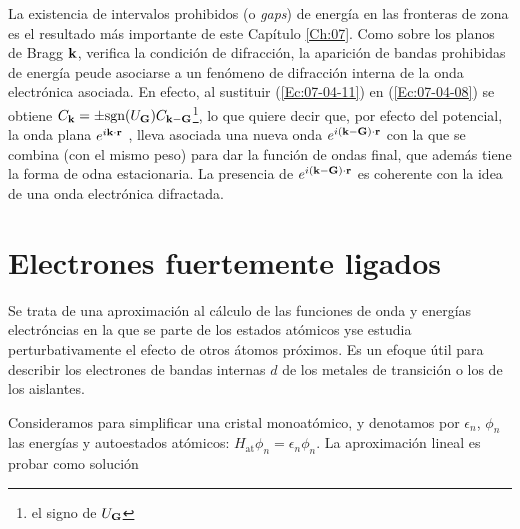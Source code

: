 La existencia de intervalos prohibidos (o \textit{gaps}) de energía en las fronteras de zona es el resultado más importante de este Capítulo \ref{Ch:07}. Como sobre los planos de Bragg $\mathbf{k}$, verifica la condición de difracción, la aparición de bandas prohibidas de energía peude asociarse a un fenómeno de difracción interna de la onda electrónica asociada. En efecto, al sustituir (\ref{Ec:07-04-11}) en (\ref{Ec:07-04-08}) se obtiene $C_{\mathbf{k}} = \pm \text{sgn}(U_{\mathbf{G}}) C_{\mathbf{k}-\mathbf{G}}$\footnote{el signo de $U_{\mathbf{G}}$}, lo que quiere decir que, por efecto del potencial, la onda plana $e^{i \mathbf{k} \cdot \mathbf{r}}$ , lleva asociada una nueva onda $e^{i(\mathbf{k} -\mathbf{G})\cdot \mathbf{r}}$ con la que se combina (con el mismo peso) para dar la función de ondas final, que además tiene la forma de odna estacionaria. La presencia de $e^{i(\mathbf{k} - \mathbf{G})\cdot \mathbf{r}}$ es coherente con la idea de una onda electrónica difractada. 

\section{Electrones fuertemente ligados}

Se trata de una aproximación al cálculo de las funciones de onda y energías electróncias en la que se parte de los estados atómicos yse estudia perturbativamente el efecto de otros átomos próximos. Es un efoque útil para describir los electrones de bandas internas $d$ de los metales de transición o los de los aislantes.

Consideramos para simplificar una cristal monoatómico, y denotamos por $\epsilon_n$, $\phi_n$ las energías y autoestados atómicos: $H_{\text{at}} \phi_n = \epsilon_n \phi_n$. La aproximación lineal es probar como solución

